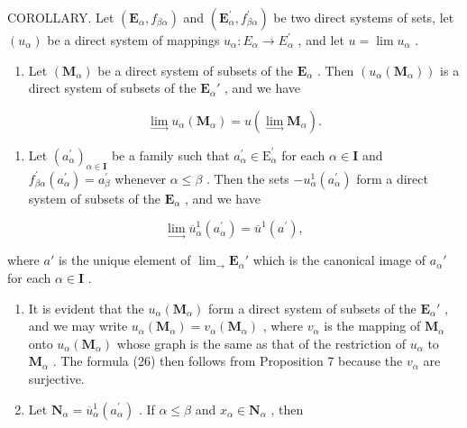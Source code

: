 COROLLARY. Let \((\mathbf{E}_{\alpha}, f_{\beta\alpha})\) and \((\mathbf{E}_{\alpha}^{\prime}, f_{\beta\alpha}^{\prime})\) be two direct systems of sets, let \((u_{\alpha})\) be a direct system of mappings \(u_{\alpha}: E_{\alpha} \to E_{\alpha}^{\prime}\) , and let \(u = \lim u_{\alpha}\) .

\begin{enumerate}
\def\labelenumi{(\roman{enumi})}
\tightlist
\item
  Let \((\mathbf{M}_{\alpha})\) be a direct system of subsets of the \(\mathbf{E}_{\alpha}\) . Then \((u_{\alpha}(\mathbf{M}_{\alpha}))\) is a direct system of subsets of the \(\mathbf{E}_{\alpha}'\) , and we have
\end{enumerate}

\[
\lim _ {\rightarrow} u _ {\alpha} (\mathbf {M} _ {\alpha}) = u (\lim _ {\rightarrow} \mathbf {M} _ {\alpha}).\tag{26}
\]

\begin{enumerate}
\def\labelenumi{(\roman{enumi})}
\setcounter{enumi}{1}
\tightlist
\item
  Let \((a_{\alpha}^{\prime})_{\alpha \in \mathbf{I}}\) be a family such that \(a_{\alpha}^{\prime} \in \mathrm{E}_{\alpha}^{\prime}\) for each \(\alpha \in \mathbf{I}\) and \(f_{\beta \alpha}^{\prime}(a_{\alpha}^{\prime}) = a_{\beta}^{\prime}\) whenever \(\alpha \leqslant \beta\) . Then the sets \(-u_{\alpha}^{1}(a_{\alpha}^{\prime})\) form a direct system of subsets of the \(\mathbf{E}_{\alpha}\) , and we have
\end{enumerate}

\[
\lim _ {\rightarrow} \overline {{{u}}} _ {\alpha} ^ {1} (a _ {\alpha} ^ {\prime}) = \overline {{{u}}} ^ {1} (a ^ {\prime}),\tag{27}
\]

where \(a'\) is the unique element of \(\lim_{\rightarrow} \mathbf{E}_{\alpha}'\) which is the canonical image of \(a_{\alpha}'\) for each \(\alpha \in \mathbf{I}\) .

\begin{enumerate}
\def\labelenumi{(\roman{enumi})}
\item
  It is evident that the \(u_{\alpha}(\mathbf{M}_{\alpha})\) form a direct system of subsets of the \(\mathbf{E}_{\alpha}'\) , and we may write \(u_{\alpha}(\mathbf{M}_{\alpha}) = v_{\alpha}(\mathbf{M}_{\alpha})\) , where \(v_{\alpha}\) is the mapping of \(\mathbf{M}_{\alpha}\) onto \(u_{\alpha}(\mathbf{M}_{\alpha})\) whose graph is the same as that of the restriction of \(u_{\alpha}\) to \(\mathbf{M}_{\alpha}\) . The formula (26) then follows from Proposition 7 because the \(v_{\alpha}\) are surjective.
\item
  Let \(\mathbf{N}_{\alpha} = \overline{u}_{\alpha}^{1}(a_{\alpha}^{\prime})\) . If \(\alpha \leqslant \beta\) and \(x_{\alpha} \in \mathbf{N}_{\alpha}\) , then
\end{enumerate}

